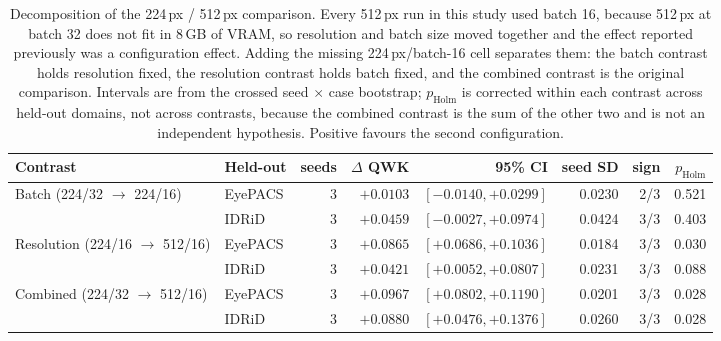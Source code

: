\begin{table}[t]
\centering
\caption{Decomposition of the 224\,px / 512\,px comparison. Every 512\,px run in this study used batch 16, because 512\,px at batch 32 does not fit in 8\,GB of VRAM, so resolution and batch size moved together and the effect reported previously was a configuration effect. Adding the missing 224\,px/batch-16 cell separates them: the batch contrast holds resolution fixed, the resolution contrast holds batch fixed, and the combined contrast is the original comparison. Intervals are from the crossed seed $\times$ case bootstrap; $p_{\text{Holm}}$ is corrected within each contrast across held-out domains, not across contrasts, because the combined contrast is the sum of the other two and is not an independent hypothesis. Positive favours the second configuration.}
\label{tab:configuration}
\begin{tabular}{llrrrrrr}
\toprule
Contrast & Held-out & seeds & $\Delta$ QWK & 95\% CI & seed SD & sign & $p_{\text{Holm}}$ \\
\midrule
Batch (224/32 $\to$ 224/16) & EyePACS & 3 & $+0.0103$ & $[-0.0140, +0.0299]$ & 0.0230 & 2/3 & 0.521 \\
 & IDRiD & 3 & $+0.0459$ & $[-0.0027, +0.0974]$ & 0.0424 & 3/3 & 0.403 \\
\addlinespace
Resolution (224/16 $\to$ 512/16) & EyePACS & 3 & $+0.0865$ & $[+0.0686, +0.1036]$ & 0.0184 & 3/3 & 0.030 \\
 & IDRiD & 3 & $+0.0421$ & $[+0.0052, +0.0807]$ & 0.0231 & 3/3 & 0.088 \\
\addlinespace
Combined (224/32 $\to$ 512/16) & EyePACS & 3 & $+0.0967$ & $[+0.0802, +0.1190]$ & 0.0201 & 3/3 & 0.028 \\
 & IDRiD & 3 & $+0.0880$ & $[+0.0476, +0.1376]$ & 0.0260 & 3/3 & 0.028 \\
\bottomrule
\end{tabular}
\end{table}
